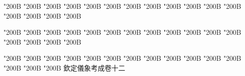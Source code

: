 \begin{正文}
\char"200B\relax{}
\char"200B\relax{}
\char"200B\relax{}
\char"200B\relax{}
\char"200B\relax{}
\char"200B\relax{}
\char"200B\relax{}
\char"200B\relax{}
\char"200B\relax{}
\char"200B\relax{}
\char"200B\relax{}
\char"200B\relax{}
\char"200B\relax{}
\char"200B\relax{}
\char"200B\relax{}
\char"200B\relax
{}\par
\end{正文}\clearpage
{}
\begin{正文}
\char"200B\relax{}
\char"200B\relax{}
\char"200B\relax{}
\char"200B\relax{}
\char"200B\relax{}
\char"200B\relax{}
\char"200B\relax{}
\char"200B\relax{}
\char"200B\relax{}
\char"200B\relax{}
\char"200B\relax{}
\char"200B\relax{}
\char"200B\relax{}
\char"200B\relax{}
\char"200B\relax{}
\char"200B\relax
{}\par
\end{正文}\clearpage
{}
\begin{正文}
\char"200B\relax{}
\char"200B\relax{}
\char"200B\relax{}
\char"200B\relax{}
\char"200B\relax{}
\char"200B\relax{}
\char"200B\relax{}
\char"200B\relax{}
\char"200B\relax{}
\char"200B\relax{}
\char"200B\relax{}
\char"200B\relax{}
\char"200B\relax{}
\char"200B\relax{}
\char"200B\relax{}
欽定儀象考成卷十二
\par

\par\end{正文}\clearpage
